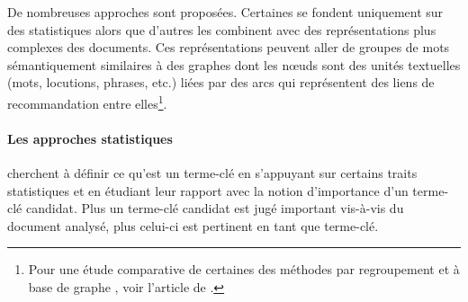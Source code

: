       De nombreuses approches sont proposées. Certaines se fondent uniquement
      sur des statistiques alors que d'autres les combinent avec des
      représentations plus complexes des documents. Ces représentations
      peuvent aller de groupes de mots sémantiquement similaires à des graphes
      dont les n\oe{}uds sont des unités textuelles (mots, locutions, phrases,
      etc.) liées par des arcs qui représentent des liens de recommandation
      entre elles\footnote{Pour une étude comparative de certaines des
      méthodes par regroupement \cite{liu2009keycluster} et à base de graphe
      \cite{mihalcea2004textrank, wan2008expandrank}, voir l'article de
      .}.

      \paragraph{Les approches statistiques}
        cherchent à définir ce qu'est un terme-clé en s'appuyant sur certains
        traits statistiques et en étudiant leur rapport avec la notion
        d'importance d'un terme-clé candidat. Plus un terme-clé candidat est
        jugé important vis-à-vis du document analysé, plus celui-ci est
        pertinent en tant que terme-clé.

